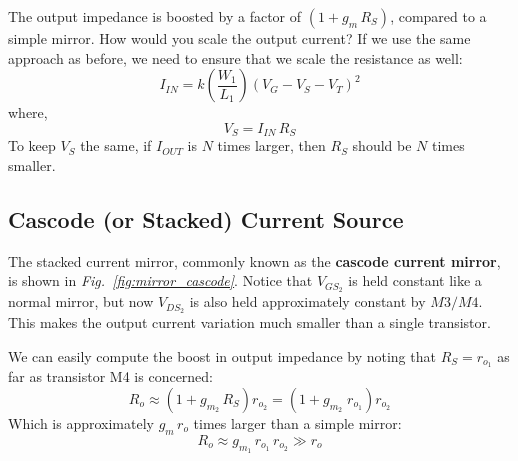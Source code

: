 \noindent
The output impedance is boosted by a factor of $(1 + g_m\,R_S)$, compared to a simple mirror.  How would you scale the output current?  If we use the same approach as before, we need to ensure that we scale the resistance as well:
    \begin{equation}
        I_{IN} = k \left(\frac{W_1}{L_1}\right){(V_G - V_S - V_T)}^2
    \end{equation}
where,
    \begin{equation}
        V_S = I_{IN}\,R_S
    \end{equation}
To keep $V_S$ the same, if $I_{OUT}$ is $N$ times larger, then $R_S$ should be $N$ times smaller.
\subsection{Cascode (or Stacked) Current Source}
The stacked current mirror, commonly known as the \textbf{cascode current mirror}, is shown in \emph{Fig.~\ref{fig:mirror_cascode}}.  Notice that $V_{GS_2}$ is held constant like a normal mirror, but now $V_{DS_2}$ is also held  approximately constant by $M3/M4$.  This makes the output current variation much smaller than a single transistor. 

We can easily compute the boost in output impedance by noting that $R_S = r_{o_1}$ as far as transistor M4 is concerned: 
    \begin{equation}
        R_o \approx \left(1 + g_{m_2}\,R_S\right)r_{o_2} = \left(1 + g_{m_2}\;r_{o_1}\right)r_{o_2}
    \end{equation}
Which is approximately $g_m\,r_o$ times larger than a simple mirror:
    \begin{equation}
        R_o \approx g_{m_1}\,r_{o_1}\,r_{o_2} \gg r_o
    \end{equation}
